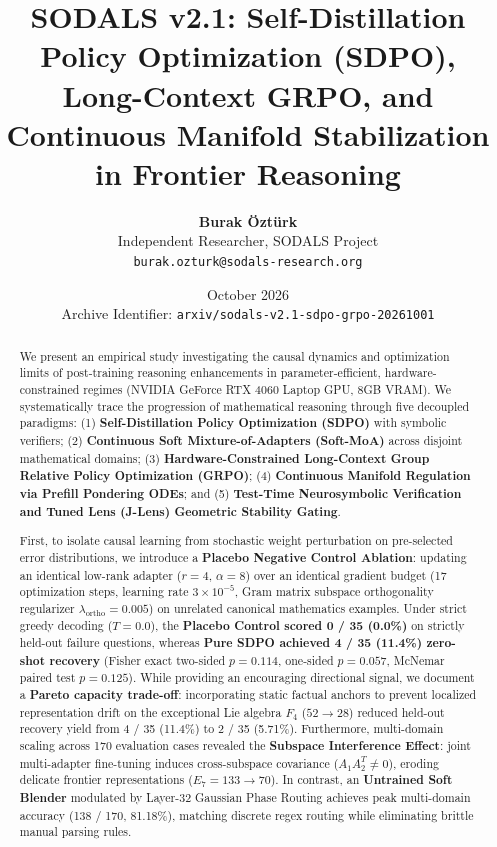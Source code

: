 \documentclass[11pt,a4paper]{article}
\title{\textbf{SODALS v2.1: Self-Distillation Policy Optimization (SDPO), Long-Context GRPO, and Continuous Manifold Stabilization in Frontier Reasoning}}
\author{
    \textbf{Burak \"Ozt\"urk} \\
    Independent Researcher, SODALS Project \\
    \texttt{burak.ozturk@sodals-research.org}
}
\date{October 2026 \\ \vspace{0.5em} \small Archive Identifier: \texttt{arxiv/sodals-v2.1-sdpo-grpo-20261001}}
\begin{document}
\maketitle

\begin{abstract}
We present an empirical study investigating the causal dynamics and optimization limits of post-training reasoning enhancements in parameter-efficient, hardware-constrained regimes (NVIDIA GeForce RTX 4060 Laptop GPU, 8GB VRAM). We systematically trace the progression of mathematical reasoning through five decoupled paradigms: (1) \textbf{Self-Distillation Policy Optimization (SDPO)} with symbolic verifiers; (2) \textbf{Continuous Soft Mixture-of-Adapters (Soft-MoA)} across disjoint mathematical domains; (3) \textbf{Hardware-Constrained Long-Context Group Relative Policy Optimization (GRPO)}; (4) \textbf{Continuous Manifold Regulation via Prefill Pondering ODEs}; and (5) \textbf{Test-Time Neurosymbolic Verification and Tuned Lens (J-Lens) Geometric Stability Gating}.

First, to isolate causal learning from stochastic weight perturbation on pre-selected error distributions, we introduce a \textbf{Placebo Negative Control Ablation}: updating an identical low-rank adapter ($r=4$, $\alpha=8$) over an identical gradient budget (17 optimization steps, learning rate $3 \times 10^{-5}$, Gram matrix subspace orthogonality regularizer $\lambda_{\mathrm{ortho}} = 0.005$) on unrelated canonical mathematics examples. Under strict greedy decoding ($T=0.0$), the \textbf{Placebo Control scored 0 / 35 (0.0\%)} on strictly held-out failure questions, whereas \textbf{Pure SDPO achieved 4 / 35 (11.4\%) zero-shot recovery} (Fisher exact two-sided $p = 0.114$, one-sided $p = 0.057$, McNemar paired test $p = 0.125$). While providing an encouraging directional signal, we document a \textbf{Pareto capacity trade-off}: incorporating static factual anchors to prevent localized representation drift on the exceptional Lie algebra $F_4$ ($52 \to 28$) reduced held-out recovery yield from 4 / 35 (11.4\%) to 2 / 35 (5.71\%). Furthermore, multi-domain scaling across 170 evaluation cases revealed the \textbf{Subspace Interference Effect}: joint multi-adapter fine-tuning induces cross-subspace covariance ($A_1 A_2^T \neq 0$), eroding delicate frontier representations ($E_7 = 133 \to 70$). In contrast, an \textbf{Untrained Soft Blender} modulated by Layer-32 Gaussian Phase Routing achieves peak multi-domain accuracy (138 / 170, 81.18\%), matching discrete regex routing while eliminating brittle manual parsing rules.


\end{abstract}
\end{document}

